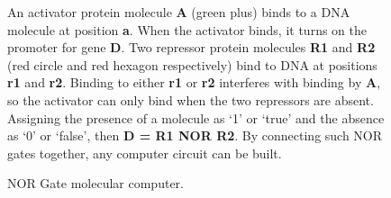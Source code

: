 \documentclass[doublespacing]{narfront}
\begin{document}
\begin{figure}[ht] %
%
\vspace{-10 cm}
\hspace{-2 cm}
\vspace{-11 cm}
\caption{NOR Gate molecular computer.}
An activator protein molecule \textbf{A} (green plus)
binds to a DNA molecule at position \textbf{a}.
When the activator binds, it turns on the promoter for gene \textbf{D}.
Two repressor protein molecules
\textbf{R1} and \textbf{R2} (red circle and red hexagon respectively)
bind to DNA at positions \textbf{r1} and \textbf{r2}.
Binding to either \textbf{r1} or \textbf{r2}
interferes with binding by \textbf{A},
so the activator can only bind when the two repressors are absent.
Assigning the presence of a molecule as `1' or `true' and the absence as `0'
or `false',
then \textbf{D = R1 NOR R2}.
By connecting such NOR gates together, any computer circuit can be built.
\label{fig.norgate}
\end{figure} %

\end{document}
